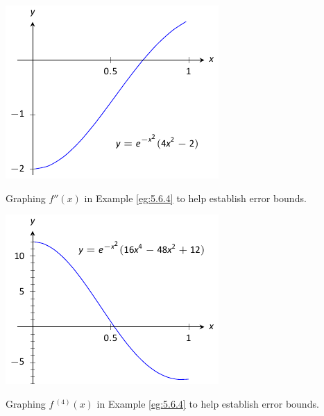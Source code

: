 \begin{marginfigure}[4cm] %
\includegraphics{figures/fignum7a} %
\caption{Graphing $f''(x)$ in Example \ref{eg:5.6.4} to help establish error bounds.}
\label{F:5-6-EG4a}
\end{marginfigure}

\begin{marginfigure}[2cm] %
\includegraphics{figures/fignum7b} %
\caption{Graphing $f\,^{(4)}(x)$ in Example \ref{eg:5.6.4} to help establish error bounds.}
\label{F:5-6-EG4b}
\end{marginfigure}


